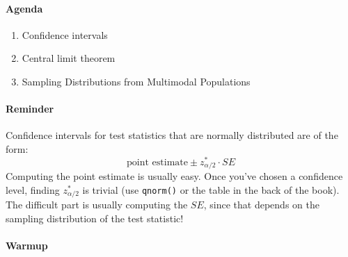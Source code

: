 \documentclass[10pt]{article}\usepackage[]{graphicx}\usepackage[]{color}
\newcommand{\cmd}[1]{\texttt{#1}}
\begin{document}
\paragraph{Agenda}
\begin{enumerate}
  \itemsep0em
  \item Confidence intervals
  \item Central limit theorem
  \item Sampling Distributions from Multimodal Populations
\end{enumerate}


\paragraph{Reminder}

Confidence intervals for test statistics that are normally distributed are of the form:
$$
  \text{point estimate} \pm z_{\alpha/2}^* \cdot SE
$$
Computing the point estimate is usually easy. Once you've chosen a confidence level, finding $z_{\alpha/2}^*$ is trivial (use \cmd{qnorm()} or the table in the back of the book). The difficult part is usually computing the $SE$, since that depends on the sampling distribution of the test statistic!

\paragraph{Warmup}
\end{document}

